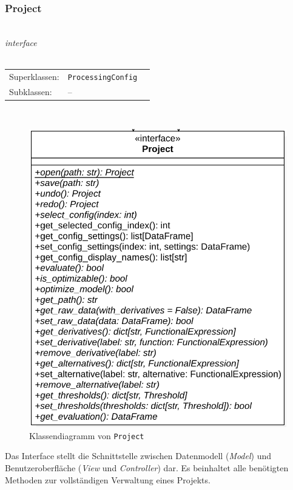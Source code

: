\documentclass{article}
\begin{document}
\subsubsection*{\large{\textbf{Project}\label{cls:Project}}}\\
\textit{\flqq{}interface\frqq}\normalsize\\\\
\begin{tabular}{lll}
 Superklassen: & \texttt{ProcessingConfig}\\
 Subklassen: & --
\end{tabular}\\
\begin{figure}[H]%
    \centering
    \includegraphics[width=13cm]{entwurf/Entwurf_dokument/img/cls/model/Project.png}
    \caption{Klassendiagramm von \texttt{Project}}
\end{figure}

Das Interface stellt die Schnittstelle zwischen Datenmodell (\emph{Model}) und Benutzeroberfläche (\emph{View} und \emph{Controller}) dar. Es beinhaltet alle benötigten Methoden zur vollständigen Verwaltung eines Projekts.
\\\\
\end{document}

